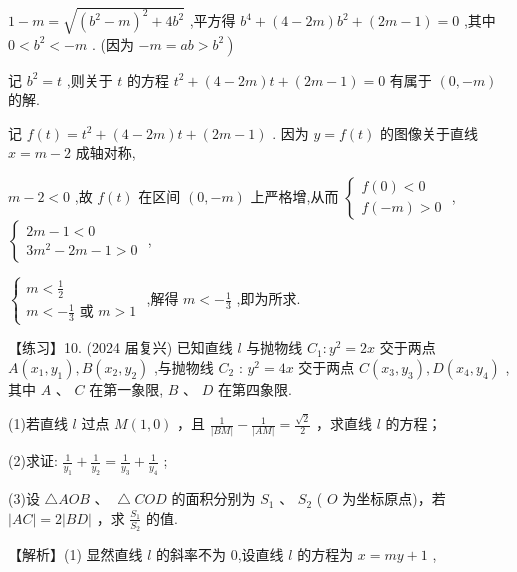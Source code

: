 \documentclass[10pt]{article}
\begin{document}
\(1 - m = \sqrt{{\left( {b}^{2} - m\right) }^{2} + 4{b}^{2}}\) ,平方得 \({b}^{4} + \left( {4 - {2m}}\right) {b}^{2} + \left( {{2m} - 1}\right)  = 0\) ,其中 \(0 < {b}^{2} <  - m\) . (因为 \(\left. {-m = {ab} > {b}^{2}}\right)\)

记 \({b}^{2} = t\) ,则关于 \(t\) 的方程 \({t}^{2} + \left( {4 - {2m}}\right) t + \left( {{2m} - 1}\right)  = 0\) 有属于 \(\left( {0, - m}\right)\) 的解.

记 \(f\left( t\right)  = {t}^{2} + \left( {4 - {2m}}\right) t + \left( {{2m} - 1}\right)\) . 因为 \(y = f\left( t\right)\) 的图像关于直线 \(x = m - 2\) 成轴对称,

\(m - 2 < 0\) ,故 \(f\left( t\right)\) 在区间 \(\left( {0, - m}\right)\) 上严格增,从而 \(\left\{  \begin{array}{l} f\left( 0\right)  < 0 \\  f\left( {-m}\right)  > 0 \end{array}\right.\) , \(\left\{  \begin{array}{l} {2m} - 1 < 0 \\  3{m}^{2} - {2m} - 1 > 0 \end{array}\right.\) ,

\(\left\{  \begin{array}{l} m < \frac{1}{2} \\  m <  - \frac{1}{3}\text{ 或 }m > 1 \end{array}\right.\) ,解得 \(m <  - \frac{1}{3}\) ,即为所求.

【练习】10. (2024 届复兴) 已知直线 \(l\) 与抛物线 \({C}_{1} : {y}^{2} = {2x}\) 交于两点 \(A\left( {{x}_{1},{y}_{1}}\right) ,B\left( {{x}_{2},{y}_{2}}\right)\) ,与抛物线 \({C}_{2}\) : \({y}^{2} = {4x}\) 交于两点 \(C\left( {{x}_{3},{y}_{3}}\right) ,D\left( {{x}_{4},{y}_{4}}\right)\) ,其中 \(A\text{ 、 }C\) 在第一象限, \(B\text{ 、 }D\) 在第四象限.

(1)若直线 \(l\) 过点 \(M\left( {1,0}\right)\) ，且 \(\frac{1}{\left| BM\right| } - \frac{1}{\left| AM\right| } = \frac{\sqrt{2}}{2}\) ，求直线 \(l\) 的方程；

(2)求证: \(\frac{1}{{y}_{1}} + \frac{1}{{y}_{2}} = \frac{1}{{y}_{3}} + \frac{1}{{y}_{4}}\) ;

(3)设 \(\bigtriangleup  {AOB}\text{ 、 } \bigtriangleup  {COD}\) 的面积分别为 \({S}_{1}\) 、 \({S}_{2}\) ( \(O\) 为坐标原点)，若 \(\left| {AC}\right|  = 2\left| {BD}\right|\) ，求 \(\frac{{S}_{1}}{{S}_{2}}\) 的值.

【解析】(1) 显然直线 \(l\) 的斜率不为 0,设直线 \(l\) 的方程为 \(x = {my} + 1\) ,
\end{document}
